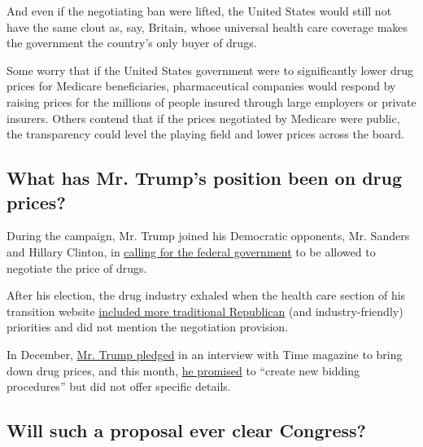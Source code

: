 And even if the negotiating ban were lifted, the United States would
still not have the same clout as, say, Britain, whose universal health
care coverage makes the government the country's only buyer of drugs.

Some worry that if the United States government were to significantly
lower drug prices for Medicare beneficiaries, pharmaceutical companies
would respond by raising prices for the millions of people insured
through large employers or private insurers. Others contend that if the
prices negotiated by Medicare were public, the transparency could level
the playing field and lower prices across the board.

\hypertarget{what-has-mr-trumps-position-been-on-drug-prices}{%
\subsection{What has Mr. Trump's position been on drug
prices?}\label{what-has-mr-trumps-position-been-on-drug-prices}}

During the campaign, Mr. Trump joined his Democratic opponents, Mr.
Sanders and Hillary Clinton, in
\href{http://info.msnbc.com/_news/2016/02/17/35127534-full-transcript-msnbcs-town-hall-with-donald-trump?lite}{calling
for the federal government} to be allowed to negotiate the price of
drugs.

After his election, the drug industry exhaled when the health care
section of his transition website
\href{http://www.politico.com/tipsheets/politico-pulse/2016/11/the-trump-transition-more-details-on-his-health-plan-and-transition-217369}{included
more traditional Republican} (and industry-friendly) priorities and did
not mention the negotiation provision.

In December,
\href{https://www.nytimes.com/2016/12/09/business/donald-trump-drug-prices-pharma-stocks.html}{Mr.
Trump pledged} in an interview with Time magazine to bring down drug
prices, and this month,
\href{http://money.cnn.com/2017/01/11/investing/donald-trump-press-conference-markets-economy/}{he
promised} to ``create new bidding procedures'' but did not offer
specific details.

\hypertarget{will-such-a-proposal-ever-clear-congress}{%
\subsection{Will such a proposal ever clear
Congress?}\label{will-such-a-proposal-ever-clear-congress}}

